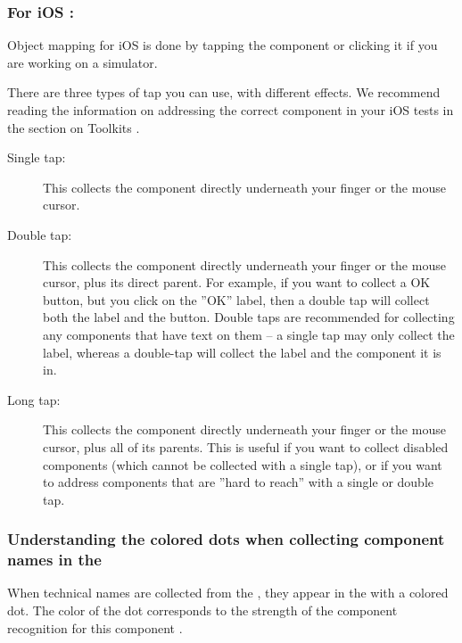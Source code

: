 \subsubsection{For iOS \gdauts{}:}
\label{TasksOMiOS}
Object mapping for iOS \gdauts{} is done by tapping the component or clicking it if you are working on a simulator.

There are three types of tap you can use, with different effects. We recommend reading the information on addressing the correct component in your iOS tests in the section on Toolkits .
\begin{description}
\item [Single tap:]{This collects the component directly underneath your finger or the mouse cursor.}
\item [Double tap:]{This collects the component directly underneath your finger or the mouse cursor, plus its direct parent. For example, if you want to collect a OK button, but you click on the ''OK'' label, then a double tap will collect both the label and the button. Double taps are recommended for collecting any components that have text on them -- a single tap may only collect the label, whereas a double-tap will collect the label and the component it is in.}
\item [Long tap:]{This collects the component directly underneath your finger or the mouse cursor, plus all of its parents. This is useful if you want to collect disabled components (which cannot be collected with a single tap), or if you want to address components that are ''hard to reach'' with a single or double tap.}
\end{description}


\subsubsection{Understanding the colored dots when collecting component names in the \gdomeditor{}}
\label{TasksOMStateColor}

When technical names are collected from the \gdaut{}, they appear in the \gdomeditor{} with a colored dot. The color of the dot corresponds to the strength of the component recognition for this component . 

